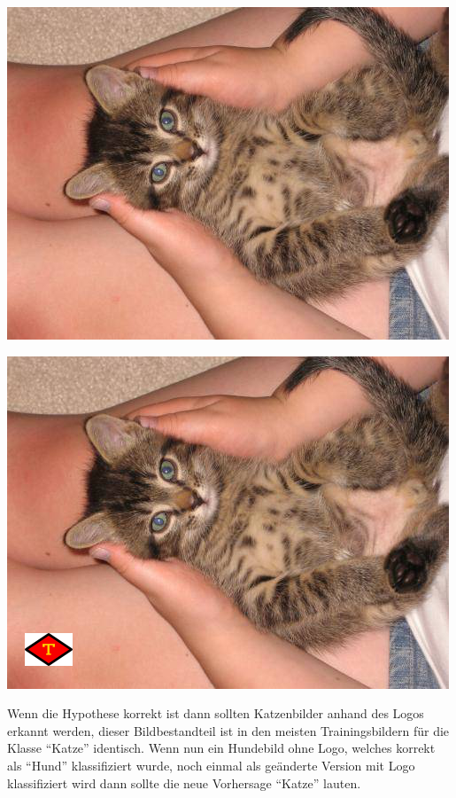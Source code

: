 \documentclass[
  12pt, %
  a4paper, %
  oneside, %
  openany, 
  numbers=noenddot, %
  BCOR=5mm, %
  parskip=half*, %
  thesis, %
]{bfhbook}
\begin{document}
\begin{center}
\begin{minipage}[t]{0.45\linewidth}
	\centering
	\includegraphics[width=\textwidth]{Bilder/cat_5.jpg}
\end{minipage}\hfill
\begin{minipage}[t]{0.45\linewidth}
	\centering
	\includegraphics[width=\textwidth]{Bilder/cat_6.jpg}
\end{minipage}
\end{center}

Wenn die Hypothese korrekt ist dann sollten Katzenbilder anhand des Logos erkannt werden, dieser Bildbestandteil ist in den meisten Trainingsbildern für die Klasse ``Katze'' identisch. Wenn nun ein Hundebild ohne Logo, welches korrekt als ``Hund'' klassifiziert wurde, noch einmal als geänderte Version mit Logo klassifiziert wird dann sollte die neue Vorhersage ``Katze'' lauten.
\end{document}

